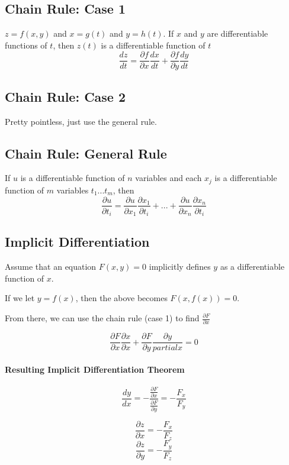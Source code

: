 \documentclass[a4paper,12pt]{report}
\begin{document}
\subsection{Chain Rule: Case 1}
$z = f(x, y)$ and $x = g(t)$ and $y = h(t)$. If $x$ and $y$ are differentiable functions of $t$, then $z(t)$ is a differentiable function of $t$
$$\frac{dz}{dt} = \frac{\partial f}{\partial x} \frac{dx}{dt} + \frac{\partial f}{\partial y} \frac{dy}{dt}$$

\subsection{Chain Rule: Case 2}
Pretty pointless, just use the general rule.

\subsection{Chain Rule: General Rule} 
If $u$ is a differentiable function of $n$ variables and each $x_j$ is a differentiable function of $m$ variables $t_1 ... t_m$, then
$$\frac{\partial u}{\partial t_i} = \frac{\partial u}{\partial x_1}\frac{\partial x_1}{\partial t_i} + ... + \frac{\partial u}{\partial x_n} \frac{\partial x_n}{\partial t_i}$$

\subsection{Implicit Differentiation}
Assume that an equation $F(x, y) = 0$ implicitly defines $y$ as a differentiable function of $x$.

If we let $y = f(x)$, then the above becomes $F(x, f(x)) = 0$.

From there, we can use the chain rule (case 1) to find $\frac{\partial F}{\partial x}$

$$\frac{\partial F}{\partial x} \frac{\partial x}{\partial x} + \frac{\partial F}{\partial y} \frac{\partial y}{partial x} = 0$$

\paragraph{Resulting Implicit Differentiation Theorem}
$$\frac{dy}{dx} = - \frac{ \frac{\partial F}{\partial x} }{ \frac{\partial F}{\partial y} } = - \frac{F_x}{F_y}$$

$$\frac{\partial z}{\partial x} = - \frac{F_x}{F_z}$$
$$\frac{\partial z}{\partial y} = - \frac{F_y}{F_z}$$
\end{document}
